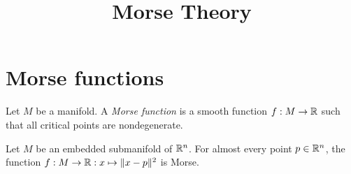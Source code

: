 \documentclass{../exp}
\title{Morse Theory}
\begin{document}
\maketitle

\section{Morse functions}

\begin{defn}
Let $M$ be a manifold.
A \emph{Morse function} is a smooth function $f:M\to\mathbb{R}$ such that all critical points are nondegenerate.
\end{defn}

\begin{prop}
Let $M$ be an embedded submanifold of $\mathbb{R}^n$.
For almost every point $p\in\mathbb{R}^n$, the function $f:M\to\mathbb{R}:x\mapsto\|x-p\|^2$ is Morse.
\end{prop}
\end{document}
